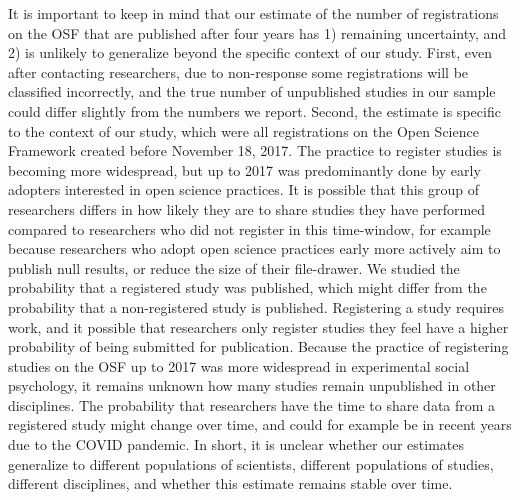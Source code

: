 \documentclass[
  ,jou, a4paper,floatsintext]{apa6}
\begin{document}
It is important to keep in mind that our estimate of the number of registrations on the OSF that are published after four years has 1) remaining uncertainty, and 2) is unlikely to generalize beyond the specific context of our study. First, even after contacting researchers, due to non-response some registrations will be classified incorrectly, and the true number of unpublished studies in our sample could differ slightly from the numbers we report. Second, the estimate is specific to the context of our study, which were all registrations on the Open Science Framework created before November 18, 2017. The practice to register studies is becoming more widespread, but up to 2017 was predominantly done by early adopters interested in open science practices. It is possible that this group of researchers differs in how likely they are to share studies they have performed compared to researchers who did not register in this time-window, for example because researchers who adopt open science practices early more actively aim to publish null results, or reduce the size of their file-drawer. We studied the probability that a registered study was published, which might differ from the probability that a non-registered study is published. Registering a study requires work, and it possible that researchers only register studies they feel have a higher probability of being submitted for publication. Because the practice of registering studies on the OSF up to 2017 was more widespread in experimental social psychology, it remains unknown how many studies remain unpublished in other disciplines. The probability that researchers have the time to share data from a registered study might change over time, and could for example be in recent years due to the COVID pandemic. In short, it is unclear whether our estimates generalize to different populations of scientists, different populations of studies, different disciplines, and whether this estimate remains stable over time.
\end{document}
